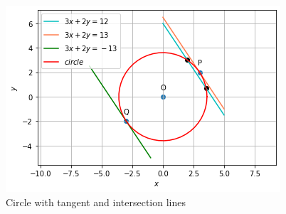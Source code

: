 \begin{figure}[!ht]
\centering
\includegraphics[width=1\columnwidth]{./solutions/4/2/2/figure.png}
\caption{Circle with tangent and intersection lines}
\label{eq:solutions/4/2/2/}
\end{figure}

